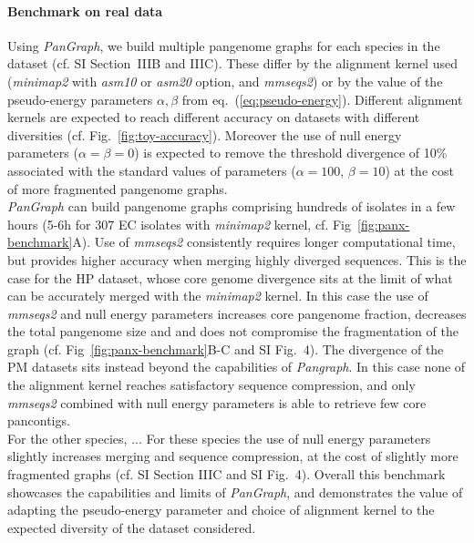 \documentclass[aps,rmp,reprint,superscriptaddress,notitlepage,10pt]{revtex4-1}
\begin{document}
\paragraph*{Benchmark on real data}

Using \textit{PanGraph}, we build multiple pangenome graphs for each species in the dataset (cf. SI Section~IIIB and IIIC). These differ by the alignment kernel used (\textit{minimap2} with \textit{asm10} or \textit{asm20} option, and \textit{mmseqs2}) or by the value of the pseudo-energy parameters $\alpha,\beta$ from eq.~(\ref{eq:pseudo-energy}). Different alignment kernels are expected to reach different accuracy on datasets with different diversities (cf. Fig.~\ref{fig:toy-accuracy}). Moreover the use of null energy parameters ($\alpha = \beta = 0$) is expected to remove the threshold divergence of 10\% associated with the standard values of parameters ($\alpha=100$, $\beta=10$) at the cost of more fragmented pangenome graphs.\\
\textit{PanGraph} can build pangenome graphs comprising hundreds of isolates in a few hours (5-6h for 307 EC isolates with \textit{minimap2} kernel, cf. Fig~\ref{fig:panx-benchmark}A). Use of \textit{mmseqs2} consistently requires longer computational time, but provides higher accuracy when merging highly diverged sequences. This is the case for the HP dataset, whose core genome divergence sits at the limit of what can be accurately merged with the \textit{minimap2} kernel. In this case the use of \textit{mmseqs2} and null energy parameters increases core pangenome fraction, decreases the total pangenome size and and does not compromise the fragmentation of the graph (cf. Fig~\ref{fig:panx-benchmark}B-C and SI Fig.~4). The divergence of the PM datasets sits instead beyond the capabilities of \textit{Pangraph}. In this case none of the alignment kernel reaches satisfactory sequence compression, and only \textit{mmseqs2} combined with null energy parameters is able to retrieve few core pancontigs.\\
For the other species, ... 
For these species the use of null energy parameters slightly increases merging and sequence compression, at the cost of slightly more fragmented graphs (cf. SI Section IIIC and SI Fig.~4). 
Overall this benchmark showcases the capabilities and limits of \textit{PanGraph}, and demonstrates the value of adapting the pseudo-energy parameter and choice of alignment kernel to the expected diversity of the dataset considered.
\end{document}
